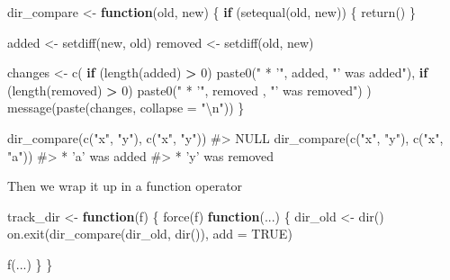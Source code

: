 \documentclass[
]{krantz}
\makeatletter
\newenvironment{Shaded}{\begin{snugshade}}{\end{snugshade}}
\newcommand{\CharTok}[1]{\textcolor[rgb]{0.31,0.60,0.02}{#1}}
\newcommand{\CommentTok}[1]{\textcolor[rgb]{0.56,0.35,0.01}{\textit{#1}}}
\newcommand{\ControlFlowTok}[1]{\textcolor[rgb]{0.13,0.29,0.53}{\textbf{#1}}}
\newcommand{\DataTypeTok}[1]{\textcolor[rgb]{0.13,0.29,0.53}{#1}}
\newcommand{\DecValTok}[1]{\textcolor[rgb]{0.00,0.00,0.81}{#1}}
\newcommand{\KeywordTok}[1]{\textcolor[rgb]{0.13,0.29,0.53}{\textbf{#1}}}
\newcommand{\NormalTok}[1]{#1}
\newcommand{\OperatorTok}[1]{\textcolor[rgb]{0.81,0.36,0.00}{\textbf{#1}}}
\newcommand{\OtherTok}[1]{\textcolor[rgb]{0.56,0.35,0.01}{#1}}
\newcommand{\StringTok}[1]{\textcolor[rgb]{0.31,0.60,0.02}{#1}}
\newenvironment{kframe}{%
\medskip{}
\setlength{\fboxsep}{.8em}
 \def\at@end@of@kframe{}%
 \ifinner\ifhmode%
  \def\at@end@of@kframe{\end{minipage}}%
  \begin{minipage}{\columnwidth}%
 \fi\fi%
 \def\FrameCommand##1{\hskip\@totalleftmargin \hskip-\fboxsep
 \colorbox{shadecolor}{##1}\hskip-\fboxsep
     \hskip-\linewidth \hskip-\@totalleftmargin \hskip\columnwidth}%
 \MakeFramed {\advance\hsize-\width
   \@totalleftmargin\z@ \linewidth\hsize
   \@setminipage}}%
 {\par\unskip\endMakeFramed%
 \at@end@of@kframe}
\renewenvironment{Shaded}{\begin{kframe}}{\end{kframe}}
\renewcommand{\KeywordTok} [1]{\textcolor[rgb]{0.00,0.44,0.13}{{#1}}}
\renewcommand{\DataTypeTok}[1]{\textcolor[rgb]{0.56,0.13,0.00}{{#1}}}
\renewcommand{\DecValTok}  [1]{\textcolor[rgb]{0.25,0.63,0.44}{{#1}}}
\renewcommand{\CharTok}    [1]{\textcolor[rgb]{0.25,0.44,0.63}{{#1}}}
\renewcommand{\StringTok}  [1]{\textcolor[rgb]{0.25,0.44,0.63}{{#1}}}
\renewcommand{\CommentTok} [1]{\textcolor[rgb]{0.38,0.63,0.69}{{#1}}}
\renewcommand{\OtherTok}   [1]{\textcolor[rgb]{0.00,0.44,0.13}{{#1}}}
\renewcommand{\NormalTok}  [1]{{#1}}
\makeatother
\begin{document}
\begin{Shaded}
\begin{Highlighting}[]
\NormalTok{dir_compare <-}\StringTok{ }\ControlFlowTok{function}\NormalTok{(old, new) \{}
  \ControlFlowTok{if}\NormalTok{ (}\KeywordTok{setequal}\NormalTok{(old, new)) \{}
    \KeywordTok{return}\NormalTok{()}
\NormalTok{  \}}
  
\NormalTok{  added <-}\StringTok{ }\KeywordTok{setdiff}\NormalTok{(new, old)}
\NormalTok{  removed <-}\StringTok{ }\KeywordTok{setdiff}\NormalTok{(old, new)}
  
\NormalTok{  changes <-}\StringTok{ }\KeywordTok{c}\NormalTok{(}
    \ControlFlowTok{if}\NormalTok{ (}\KeywordTok{length}\NormalTok{(added) }\OperatorTok{>}\StringTok{ }\DecValTok{0}\NormalTok{) }\KeywordTok{paste0}\NormalTok{(}\StringTok{" * '"}\NormalTok{, added, }\StringTok{"' was added"}\NormalTok{),}
    \ControlFlowTok{if}\NormalTok{ (}\KeywordTok{length}\NormalTok{(removed) }\OperatorTok{>}\StringTok{ }\DecValTok{0}\NormalTok{) }\KeywordTok{paste0}\NormalTok{(}\StringTok{" * '"}\NormalTok{, removed ,}
                                    \StringTok{"' was removed"}\NormalTok{)}
\NormalTok{  )}
  \KeywordTok{message}\NormalTok{(}\KeywordTok{paste}\NormalTok{(changes, }\DataTypeTok{collapse =} \StringTok{"}\CharTok{\textbackslash{}n}\StringTok{"}\NormalTok{))}
\NormalTok{\}}

\KeywordTok{dir_compare}\NormalTok{(}\KeywordTok{c}\NormalTok{(}\StringTok{"x"}\NormalTok{, }\StringTok{"y"}\NormalTok{), }\KeywordTok{c}\NormalTok{(}\StringTok{"x"}\NormalTok{, }\StringTok{"y"}\NormalTok{))}
\CommentTok{#> NULL}
\KeywordTok{dir_compare}\NormalTok{(}\KeywordTok{c}\NormalTok{(}\StringTok{"x"}\NormalTok{, }\StringTok{"y"}\NormalTok{), }\KeywordTok{c}\NormalTok{(}\StringTok{"x"}\NormalTok{, }\StringTok{"a"}\NormalTok{))}
\CommentTok{#>  * 'a' was added}
\CommentTok{#>  * 'y' was removed}
\end{Highlighting}
\end{Shaded}

Then we wrap it up in a function operator

\begin{Shaded}
\begin{Highlighting}[]
\NormalTok{track_dir <-}\StringTok{ }\ControlFlowTok{function}\NormalTok{(f) \{}
  \KeywordTok{force}\NormalTok{(f)}
  \ControlFlowTok{function}\NormalTok{(...) \{}
\NormalTok{    dir_old <-}\StringTok{ }\KeywordTok{dir}\NormalTok{()}
    \KeywordTok{on.exit}\NormalTok{(}\KeywordTok{dir_compare}\NormalTok{(dir_old, }\KeywordTok{dir}\NormalTok{()), }\DataTypeTok{add =} \OtherTok{TRUE}\NormalTok{)}
    
    \KeywordTok{f}\NormalTok{(...)}
\NormalTok{  \}}
\NormalTok{\}}
\end{Highlighting}
\end{Shaded}
\end{document}
